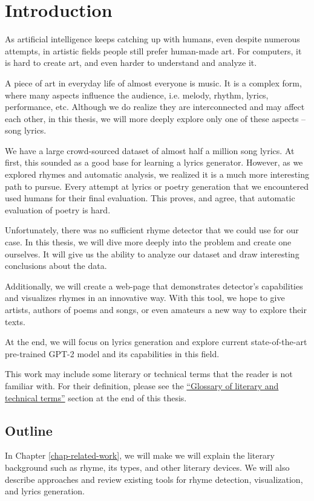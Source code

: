 \chapter*{Introduction}

As artificial intelligence keeps catching up with humans, even despite numerous attempts, in artistic fields people still prefer human-made art.
For computers, it is hard to create art, and even harder to understand and analyze it.

A piece of art in everyday life of almost everyone is music. It is a complex form, where many aspects influence the audience, i.e. melody, rhythm, lyrics, performance, etc. Although we do realize they are interconnected and may affect each other, in this thesis, we will more deeply explore only one of these aspects -- song lyrics. 

We have a large crowd-sourced dataset of almost half a million  song lyrics. At first, this sounded as a good base for learning a lyrics generator. However, as we explored rhymes and automatic analysis, we realized it is a much more interesting path to pursue. Every attempt at lyrics or poetry generation that we encountered used humans for their final evaluation. This proves, and \cite{greene2010automatic} agree, that automatic evaluation of poetry is hard.

Unfortunately, there was no sufficient rhyme detector that we could use for our case. In this thesis, we will dive more deeply into the problem and create one ourselves. It will give us the ability to analyze our dataset and draw interesting conclusions about the data. 

Additionally, we will create a web-page that demonstrates detector's capabilities and visualizes rhymes in an innovative way. With this tool, we hope to give artists, authors of poems and songs, or even amateurs a new way to explore their texts.

At the end, we will focus on lyrics generation and explore current state-of-the-art
pre-trained GPT-2 model and its capabilities in this field.

This work may include some literary or technical terms that the reader is not familiar with. For their definition, please see the \hyperref[glossary-section]{``Glossary of literary and technical terms''} section at the end of this thesis.


\section*{Outline}
In Chapter \ref{chap-related-work}, we will make we will explain the literary background such as rhyme, its types, and other literary devices. We will also describe approaches and review existing tools for rhyme detection, visualization, and lyrics generation. 

